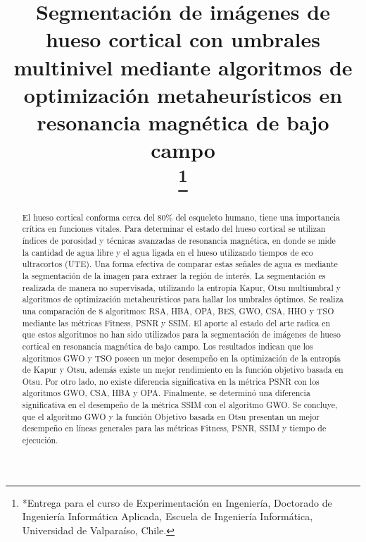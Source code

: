 \documentclass[conference]{IEEEtran}
\begin{document}
\title{Segmentación de imágenes de hueso cortical con umbrales multinivel mediante algoritmos de optimización metaheurísticos en resonancia magnética de bajo campo\\
\thanks{*Entrega para el curso de Experimentación en Ingeniería, Doctorado de Ingeniería Informática Aplicada, Escuela de Ingeniería Informática, Universidad de Valparaíso, Chile.}
}

\author{
\and
{}
}

\maketitle

\begin{abstract}
\noindent El hueso cortical conforma cerca del 80\% del esqueleto humano, tiene una importancia crítica en funciones vitales. Para determinar el estado del hueso cortical se utilizan índices de porosidad y técnicas avanzadas de resonancia magnética, en donde se mide la cantidad de agua libre y el agua ligada en el hueso utilizando tiempos de eco ultracortos (UTE). Una forma efectiva de comparar estas señales de agua es mediante la segmentación de la imagen para extraer la región de interés. La segmentación es realizada de manera no supervisada, utilizando la entropía Kapur, Otsu multiumbral y algoritmos de optimización metaheurísticos para hallar los umbrales óptimos. Se realiza una comparación de 8 algoritmos: RSA, HBA, OPA, BES, GWO, CSA, HHO y TSO mediante las métricas Fitness, PSNR y SSIM. El aporte al estado del arte radica en que estos algoritmos no han sido utilizados para la segmentación de imágenes de hueso cortical en resonancia magnética de bajo campo. Los resultados indican que los algoritmos GWO y TSO poseen un mejor desempeño en la optimización de la entropía de Kapur y Otsu, además existe un mejor rendimiento en la función objetivo basada en Otsu. Por otro lado, no existe diferencia significativa en la métrica PSNR con los algoritmos GWO, CSA, HBA y OPA. Finalmente, se determinó una diferencia significativa en el desempeño de la métrica SSIM con el algoritmo GWO. Se concluye, que el algoritmo GWO y la función Objetivo basada en Otsu presentan un mejor desempeño en líneas generales para las métricas Fitness, PSNR, SSIM y tiempo de ejecución.

\end{abstract}
\end{document}
